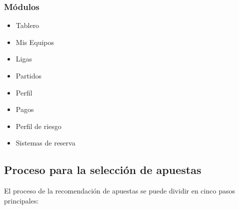 \subsubsection{Módulos}

 \begin{itemize}
 	\item Tablero
 	\item Mis Equipos
 	\item Ligas
 	\item Partidos
 	\item Perfil
 	\item Pagos
 	\item Perfil de riesgo
 	\item Sistemas de reserva
 \end{itemize}
 
 \subsection{Proceso para la selección de apuestas}

%
%
 
 El proceso de la recomendación de apuestas se puede dividir en cinco pasos principales:


